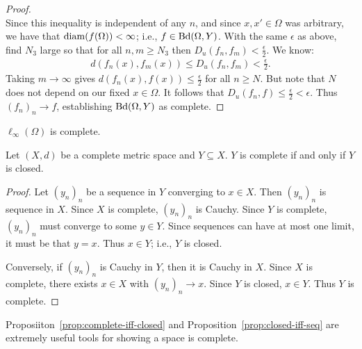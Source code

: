 \begin{proof}
\begin{equation*}
                \end{equation*}
            Since this inequality is independent of any $n$, and since $x,x' \in \Omega$ was arbitrary, we have that $\operatorname{diam}(f(\Omega)) < \infty$; i.e., $f \in \operatorname{Bd}(\Omega,Y)$. With the same $\epsilon$ as above, find $N_3$ large so that for all $n,m \geq N_3$ then $D_u(f_n,f_m) <\frac{\epsilon}{2}$. We know:
                \begin{equation*}
                \begin{split}
                    d(f_n(x),f_m(x)) \leq D_u(f_n,f_m) < \frac{\epsilon}{2}.
                \end{split}
                \end{equation*}
            Taking $m \rightarrow \infty$ gives $d(f_n(x),f(x)) \leq \frac{\epsilon}{2}$ for all $n \geq N$. But note that $N$ does not depend on our fixed $x \in \Omega$. It follows that $D_u(f_n,f) \leq \frac{\epsilon}{2} < \epsilon$. Thus $(f_n)_n \rightarrow f$, establishing $\operatorname{Bd}(\Omega,Y)$ as complete.
        \end{proof}

    \begin{corollary}
        $\ell_\infty(\Omega)$ is complete.
    \end{corollary}

    \begin{proposition}\label{prop:complete-iff-closed}
        Let $(X,d)$ be a complete metric space and $Y \subseteq X$. $Y$ is complete if and only if $Y$ is closed.
    \end{proposition}
        \begin{proof}
            Let $(y_n)_n$ be a sequence in $Y$ converging to $x \in X$. Then $(y_n)_n$ is sequence in $X$. Since $X$ is complete, $(y_n)_n$ is Cauchy. Since $Y$ is complete, $(y_n)_n$ must converge to some $y \in Y$. Since sequences can have at most one limit, it must be that $y = x$. Thus $x \in Y$; i.e., $Y$ is closed.

            Conversely, if $(y_n)_n$ is Cauchy in $Y$, then it is Cauchy in $X$. Since $X$ is complete, there exists $x \in X$ with $(y_n)_n \rightarrow x$. Since $Y$ is closed, $x \in Y$. Thus $Y$ is complete.
        \end{proof}

    Proposiiton~\ref{prop:complete-iff-closed} and Proposition~\ref{prop:closed-iff-seq} are extremely useful tools for showing a space is complete.

